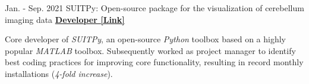 \begin{cventries}
    
  \cventry
    {Jan. - Sep. 2021} %
  	{SUITPy: Open-source package for the visualization of cerebellum imaging data} %
  	{\href{https://suitpy.readthedocs.io/en/latest/}{\textbf{Developer [Link]}}}
  	{}
    {
      \begin{cvitems} %
      	\item {Core developer of \textit{SUITPy}, an open-source \textit{Python} toolbox based on a highly popular \textit{MATLAB} toolbox. Subsequently worked as project manager to identify best coding practices for improving core functionality, resulting in record monthly installations (\textit{4-fold increase}).}
      \end{cvitems}
    }
    
    
    

\end{cventries}
